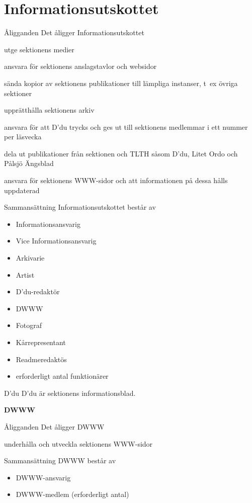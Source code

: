 \documentclass[pdfbookmarks,a4paper,11pt]{article}
\newlength{\itemcollength}
\newenvironment{reglemlista}{%
  \begin{list}{}{%
      \setlength{\labelwidth}{\itemcollength}%
      \setlength{\leftmargin}{\labelwidth + \labelsep}%
      \renewcommand{\makelabel}[1]{%
        \raisebox{0pt}[1ex][0pt]{%
          \makebox[\labelwidth][l]{%
            \parbox[t]{\itemcollength}{%
              \raggedright\hspace{0pt}##1}}}\hfill}%
      }}{%
  \end{list}}
\begin{document}
\section{Informationsutskottet}

\begin{reglemlista}

	\item[Åligganden]
	Det åligger Informationsutskottet
	\begin{attlista}
		\item utge sektionens medier
		\item ansvara för sektionens anslagstavlor och websidor
		\item sända kopior av sektionens publikationer till lämpliga instanser, t~ex övriga sektioner
		\item upprätthålla sektionens arkiv
		\item ansvara för att D'du trycks och ges ut till sektionens medlemmar i ett nummer per läsvecka
		\item dela ut publikationer från sektionen och TLTH såsom D'du, Litet Ordo och Pålsjö Ängsblad
		\item ansvara för sektionens WWW-sidor och att informationen på dessa hålls uppdaterad
	\end{attlista}

	\item[Sammansättning]
	Informationsutskottet består av
	\begin{itemize}
		\item Informationsansvarig
		\item Vice Informationsansvarig
		\item Arkivarie
		\item Artist
		\item D'du-redaktör
		\item DWWW
		\item Fotograf
		\item Kårrepresentant
		\item Readmeredaktös
		\item erforderligt antal funktionärer
	\end{itemize}

	\item[D'du]
	D'du är sektionens informationsblad.

	\item[\textbf{DWWW}]

	\item[Åligganden]
	Det åligger DWWW
	\begin{attlista}
		\item underhålla och utveckla sektionens WWW-sidor
	\end{attlista}

	\item[Sammansättning]
	DWWW består av
	\begin{itemize}
		\item DWWW-ansvarig
		\item DWWW-medlem (erforderligt antal)
	\end{itemize}

\end{reglemlista}
\end{document}
